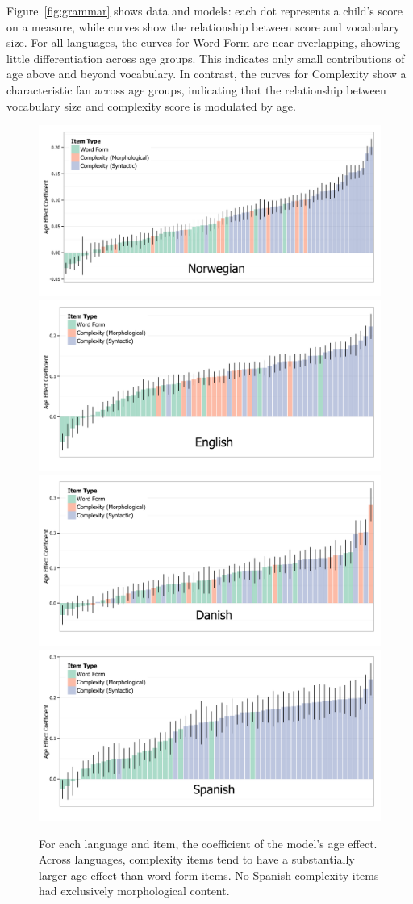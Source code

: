 \documentclass[10pt,letterpaper]{article}
\begin{document}
Figure~\ref{fig:grammar} shows data and models: each dot represents a child's score on a measure, while curves show the relationship between score and vocabulary size.
For all languages, the curves for Word Form are near overlapping, showing little differentiation across age groups. This indicates only small contributions of age above and beyond vocabulary. In contrast, the curves for Complexity show a characteristic fan across age groups, indicating that the relationship between vocabulary size and complexity score is modulated by age. %

\begin{figure}
\centering
\includegraphics[width=.49\textwidth]{plots/norwegian_interactions}
\includegraphics[width=.49\textwidth]{plots/english_interactions}\\
\includegraphics[width=.49\textwidth]{plots/danish_interactions}
\includegraphics[width=.49\textwidth]{plots/spanish_interactions} 
\caption{\label{fig:interactions} For each language and item, the coefficient of the model's age effect. Across languages, complexity items tend to have a substantially larger age effect than word form items. No Spanish complexity items had exclusively morphological content.}
\end{figure}
\end{document}
